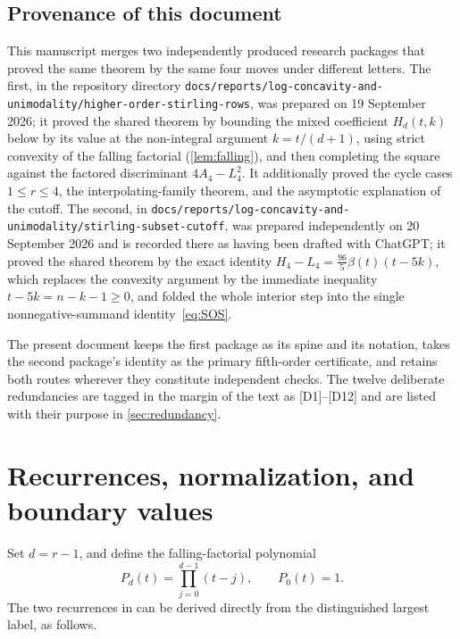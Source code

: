 \documentclass[11pt,a4paper]{article}
\numberwithin{equation}{section}
\theoremstyle{definition}
\theoremstyle{remark}
\newcommand{\dup}[1]{{\small\textsf{\color{MutedInk}[#1]}}}
\begin{document}
\subsection{Provenance of this document}\label{subsec:provenance}

This manuscript merges two independently produced research packages that
proved the same theorem by the same four moves under different letters.
The first, in the repository directory
\texttt{docs/reports/log-concavity-and-unimodality/higher-order-stirling-rows},
was prepared on 19 September 2026; it proved the shared theorem by bounding
the mixed coefficient $H_d(t,k)$ below by its value at the non-integral
argument $k=t/(d+1)$, using strict convexity of the falling factorial
(\cref{lem:falling}), and then completing the square against the factored
discriminant $4A_4-L_4^2$. It additionally proved the cycle cases
$1\le r\le4$, the interpolating-family theorem, and the asymptotic
explanation of the cutoff. The second, in
\texttt{docs/reports/log-concavity-and-unimodality/stirling-subset-cutoff},
was prepared independently on 20 September 2026 and is recorded there as
having been drafted with ChatGPT; it proved the shared theorem by the exact
identity $H_4-L_4=\frac{96}{5}\beta(t)(t-5k)$, which replaces the convexity
argument by the immediate inequality $t-5k=n-k-1\ge0$, and folded the whole
interior step into the single nonnegative-summand identity~\eqref{eq:SOS}.

The present document keeps the first package as its spine and its notation,
takes the second package's identity as the primary fifth-order certificate,
and retains both routes wherever they constitute independent checks. The
twelve deliberate redundancies are tagged in the margin of the text as
\dup{D1}--\dup{D12} and are listed with their purpose in
\cref{sec:redundancy}.

\section{Recurrences, normalization, and boundary values}\label{sec:recurrence}

Set $d=r-1$, and define the falling-factorial polynomial
\begin{equation}\label{eq:P}
 P_d(t)=\prod_{j=0}^{d-1}(t-j),\qquad P_0(t)=1.
\end{equation}
The two recurrences in \cite[Lemma~1.1]{DebSokal} can be derived directly
from the distinguished largest label, as follows.
\end{document}
